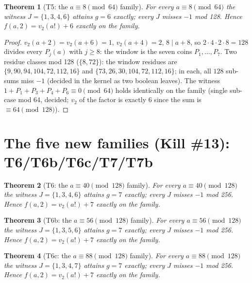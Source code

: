 \documentclass[11pt]{article}
\newtheorem{theorem}{Theorem}
\newcommand{\vtwo}{v_2}
\begin{document}
\begin{theorem}[T5: the $a \equiv 8 \pmod{64}$ family]
For every $a \equiv 8 \pmod{64}$ the witness $J = \{1,3,4,6\}$ attains
$g = 6$ exactly; every $J$ misses $-1$ mod 128. Hence
$f(a,2) = \vtwo(a!) + 6$ exactly on the family.
\end{theorem}

\begin{proof}
$\vtwo(a+2) = \vtwo(a+6) = 1$, $\vtwo(a+4) = 2$, $8 \mid a+8$, so
$2\cdot 4 \cdot 2 \cdot 8 = 128$ divides every $P_j(a)$ with $j \ge 8$:
the window is the seven coins $P_1, \dots, P_7$. Two residue classes
mod 128 ($\{8, 72\}$): the window residues are
$\{9, 90, 94, 104, 72, 112, 16\}$ and $\{73, 26, 30, 104, 72, 112, 16\}$;
in each, all $128$ sub-sums miss $-1$ (decided in the kernel as two
boolean leaves). The witness $1 + P_1 + P_3 + P_4 + P_6 \equiv 0
\pmod{64}$ holds identically on the family (single sub-case mod 64,
decided; $v_2$ of the factor is exactly 6 since the sum is
$\equiv 64 \pmod{128}$).
\end{proof}

\section*{The five new families (Kill \#13): T6/T6b/T6c/T7/T7b}

\begin{theorem}[T6: the $a \equiv 40 \pmod{128}$ family]
For every $a \equiv 40 \pmod{128}$ the witness $J = \{1,3,4,6\}$ attains
$g = 7$ exactly; every $J$ misses $-1$ mod 256. Hence
$f(a,2) = \vtwo(a!) + 7$ exactly on the family.
\end{theorem}

\begin{theorem}[T6b: the $a \equiv 56 \pmod{128}$ family]
For every $a \equiv 56 \pmod{128}$ the witness $J = \{1,3,5,6\}$ attains
$g = 7$ exactly; every $J$ misses $-1$ mod 256. Hence
$f(a,2) = \vtwo(a!) + 7$ exactly on the family.
\end{theorem}

\begin{theorem}[T6c: the $a \equiv 88 \pmod{128}$ family]
For every $a \equiv 88 \pmod{128}$ the witness $J = \{1,3,4,7\}$ attains
$g = 7$ exactly; every $J$ misses $-1$ mod 256. Hence
$f(a,2) = \vtwo(a!) + 7$ exactly on the family.
\end{theorem}
\end{document}
